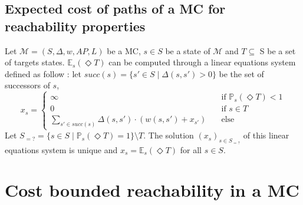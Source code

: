 \subsection{Expected cost of paths of a MC for reachability properties}
  Let $\mathcal{M} = (S, \Delta, w, AP, L)$ be a MC, $s \in S$ be a state of $\mathcal{M}$ and $T \subseteq$ S be a set of targets states. $\mathbb{E}_s(\Diamond T)$ can be computed through a linear equations system defined as follow :
  let $succ(s) = \{ s' \in S \; | \; \Delta(s, s') > 0 \}$ be the set of successors of $s$,
  \[ x_s =
  	\begin{cases}
  	\infty & \quad \text{if } \mathbb{P}_s(\Diamond T) < 1 \\
  	0 & \quad \text{if } s \in T \\
  	\sum_{s' \in succ(s)} \Delta(s, s') \cdot (w(s, s') + x_{s'}) & \quad \text{else}
  	\end{cases}
  \]
Let $S_{=?} = \{ s \in S \; | \; \mathbb{P}_s(\Diamond T) = 1 \} \setminus T$. The solution $(x_s)_{s \in S_{=?}}$ of this linear equations system is unique and $x_s = \mathbb{E}_s(\Diamond T)$ for all $s \in S$.

\section{Cost bounded reachability in a MC}

